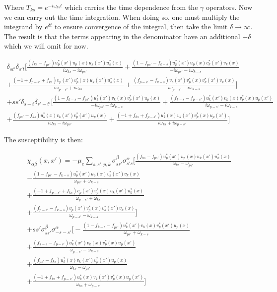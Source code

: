 \documentclass{article}
\begin{document}
Where $T_{ks}=e^{-i\omega_{ks}t}$ which carries the time dependence from the $\gamma$ operators. Now we can carry out the time integration. When doing so, one must multiply the integrand by $e^{\delta t}$ to ensure convergence of the integral, then take the limit $\delta\rightarrow\infty$. The result is that the terms appearing in the denominator have an additional $+\delta$ which we will omit for now.

\begin{align*}
\delta_{st'}\delta_{s't}\bigg[\frac{(f_{ks}-f_{ps'})u^*_p(x')u_p(x)u_k(x')u^*_k(x)}{i\omega_{ks}-i\omega_{ps'}}
+\frac{(1-f_{ps'}-f_{k-s})u^*_p(x')u_p(x)v^*_k(x')v_k(x)}{-i\omega_{ps'}-i\omega_{k-s}} \\
+\frac{(-1+f_{p-s'}+f_{ks})v_p(x')v^*_p(x)u_k(x')u^*_k(x)}{i\omega_{p-s'}+i\omega_{ks}}
+\frac{(f_{p-s'}-f_{k-s})v_p(x')v^*_p(x)v^*_k(x')v_k(x)}{i\omega_{p-s'}-i\omega_{k-s}}\bigg] \\
+ss'\delta_{s-t}\delta_{s'-t'}\bigg[\frac{(1-f_{k-s}-f_{ps'})u^*_k(x')v_k(x)v^*_p(x')u_p(x)}{-i\omega_{ps'}-i\omega_{k-s}}
+\frac{(f_{k-s}-f_{p-s'})u^*_k(x')v_k(x)v^*_p(x)u_p(x')}{i\omega_{p-s'}-i\omega_{k-s}} \\
+\frac{(f_{ps'}-f_{ks})u^*_k(x)v_k(x')v^*_p(x')u_p(x)}{i\omega_{ks}-i\omega_{ps'}}
+\frac{(-1+f_{ks}+f_{p-s'})u^*_k(x)v_k(x')v^*_p(x)u_p(x')}{i\omega_{ks}+i\omega_{p-s'}}\bigg]
\end{align*}

The susceptibility is then:

\begin{align*}
\chi_{\alpha\beta}(x,x')=-\mu_e\sum\limits_{s,s',p,k}\sigma^\beta_{ss'}\sigma^\alpha_{s's}\bigg[\frac{(f_{ks}-f_{ps'})u^*_p(x')u_p(x)u_k(x')u^*_k(x)}{\omega_{ks}-\omega_{ps'}} \\
-\frac{(1-f_{ps'}-f_{k-s})u^*_p(x')u_p(x)v^*_k(x')v_k(x)}{\omega_{ps'}+\omega_{k-s}} \\
+\frac{(-1+f_{p-s'}+f_{ks})v_p(x')v^*_p(x)u_k(x')u^*_k(x)}{\omega_{p-s'}+\omega_{ks}} \\
+\frac{(f_{p-s'}-f_{k-s})v_p(x')v^*_p(x)v^*_k(x')v_k(x)}{\omega_{p-s'}-\omega_{k-s}}\bigg] \\
+ss'\sigma^\beta_{ss'}\sigma^\alpha_{-s-s'}\bigg[-\frac{(1-f_{k-s}-f_{ps'})u^*_k(x')v_k(x)v^*_p(x')u_p(x)}{\omega_{ps'}+\omega_{k-s}} \\
+\frac{(f_{k-s}-f_{p-s'})u^*_k(x')v_k(x)v^*_p(x)u_p(x')}{\omega_{p-s'}-\omega_{k-s}} \\
+\frac{(f_{ps'}-f_{ks})u^*_k(x)v_k(x')v^*_p(x')u_p(x)}{\omega_{ks}-\omega_{ps'}} \\
+\frac{(-1+f_{ks}+f_{p-s'})u^*_k(x)v_k(x')v^*_p(x)u_p(x')}{\omega_{ks}+\omega_{p-s'}}\bigg]
\end{align*}
\end{document}

